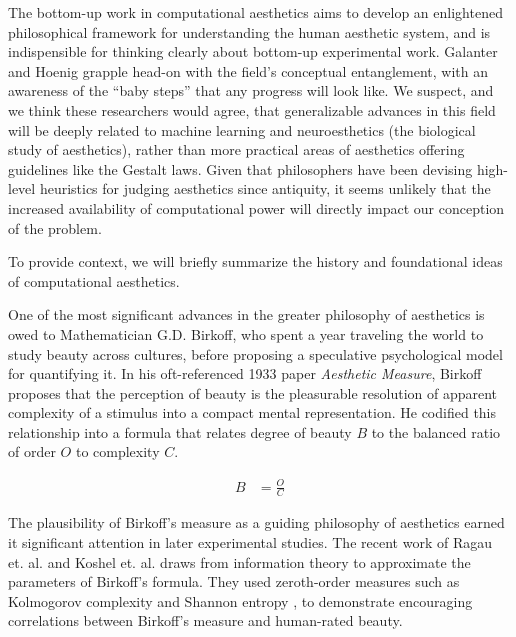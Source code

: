 \documentclass[midd]{thesis}
\begin{document}
The bottom-up work in computational aesthetics aims to develop an enlightened philosophical framework for understanding the human aesthetic system, and is indispensible for thinking clearly about bottom-up experimental work. Galanter and Hoenig grapple head-on with the field's conceptual entanglement, with an awareness of the ``baby steps'' that any progress will look like. We suspect, and we think these researchers would agree, that generalizable advances in this field will be deeply related to machine learning and neuroesthetics (the biological study of aesthetics), rather than more practical areas of aesthetics offering guidelines like the Gestalt laws. Given that philosophers have been devising high-level heuristics for judging aesthetics since antiquity, it seems unlikely that the increased availability of computational power will directly impact our conception of the problem.

To provide context, we will briefly summarize the history and foundational ideas of computational aesthetics.

One of the most significant advances in the greater philosophy of aesthetics is owed to Mathematician G.D. Birkoff, who spent a year traveling the world to study beauty across cultures, before proposing a speculative psychological model for quantifying it. In his oft-referenced 1933 paper \emph{Aesthetic Measure}, Birkoff proposes that the perception of beauty is the pleasurable resolution of apparent complexity of a stimulus into a compact mental representation. He codified this relationship into a formula that relates degree of beauty $B$ to the balanced ratio of order $O$ to complexity $C$.

\begin{align*}
B &= \frac{O}{C}
\end{align*}

The plausibility of Birkoff's measure as a guiding philosophy of aesthetics earned it significant attention in later experimental studies. The recent work of Ragau et. al. and Koshel et. al. draws from information theory to approximate the parameters of Birkoff's formula. They used zeroth-order measures such as Kolmogorov complexity and Shannon entropy \cite{rigau-1, koshelev-1}, to demonstrate encouraging correlations between Birkoff's measure and human-rated beauty.
\end{document}
